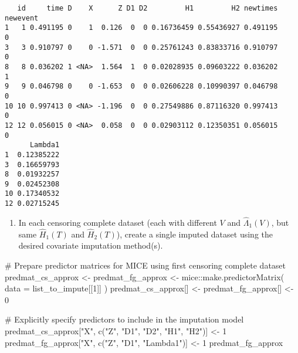 \documentclass[
  12pt,
  a4paper,
]{article}
\newenvironment{Shaded}{\begin{snugshade}}{\end{snugshade}}
\newcommand{\AttributeTok}[1]{\textcolor[rgb]{0.40,0.45,0.13}{#1}}
\newcommand{\CommentTok}[1]{\textcolor[rgb]{0.37,0.37,0.37}{#1}}
\newcommand{\DecValTok}[1]{\textcolor[rgb]{0.68,0.00,0.00}{#1}}
\newcommand{\FunctionTok}[1]{\textcolor[rgb]{0.28,0.35,0.67}{#1}}
\newcommand{\NormalTok}[1]{\textcolor[rgb]{0.00,0.23,0.31}{#1}}
\newcommand{\OtherTok}[1]{\textcolor[rgb]{0.00,0.23,0.31}{#1}}
\newcommand{\SpecialCharTok}[1]{\textcolor[rgb]{0.37,0.37,0.37}{#1}}
\newcommand{\StringTok}[1]{\textcolor[rgb]{0.13,0.47,0.30}{#1}}
\providecommand{\tightlist}{%
  \setlength{\itemsep}{0pt}\setlength{\parskip}{0pt}}\usepackage{longtable,booktabs,array}
\begin{document}
\begin{verbatim}
   id     time D    X      Z D1 D2         H1         H2 newtimes newevent
1   1 0.491195 0    1  0.126  0  0 0.16736459 0.55436927 0.491195        0
3   3 0.910797 0    0 -1.571  0  0 0.25761243 0.83833716 0.910797        0
8   8 0.036202 1 <NA>  1.564  1  0 0.02028935 0.09603222 0.036202        1
9   9 0.046798 0    0 -1.653  0  0 0.02606228 0.10990397 0.046798        0
10 10 0.997413 0 <NA> -1.196  0  0 0.27549886 0.87116320 0.997413        0
12 12 0.056015 0 <NA>  0.058  0  0 0.02903112 0.12350351 0.056015        0
      Lambda1
1  0.12385222
3  0.16659793
8  0.01932257
9  0.02452308
10 0.17340532
12 0.02715245
\end{verbatim}

\begin{enumerate}
\def\labelenumi{\arabic{enumi}.}
\setcounter{enumi}{3}
\tightlist
\item
  In each censoring complete dataset (each with different \(V\) and
  \(\hat{\Lambda}_1(V)\), but same \(\hat{H}_1(T)\) and
  \(\hat{H}_2(T)\)), create a single imputed dataset using the desired
  covariate imputation method(s).
\end{enumerate}

\begin{Shaded}
\begin{Highlighting}[]
\CommentTok{\# Prepare predictor matrices for MICE using first censoring complete dataset}
\NormalTok{predmat\_cs\_approx }\OtherTok{\textless{}{-}}\NormalTok{ predmat\_fg\_approx }\OtherTok{\textless{}{-}}\NormalTok{ mice}\SpecialCharTok{::}\FunctionTok{make.predictorMatrix}\NormalTok{(}
  \AttributeTok{data =}\NormalTok{ list\_to\_impute[[}\DecValTok{1}\NormalTok{]]}
\NormalTok{)}
\NormalTok{predmat\_cs\_approx[] }\OtherTok{\textless{}{-}}\NormalTok{ predmat\_fg\_approx[] }\OtherTok{\textless{}{-}} \DecValTok{0}

\CommentTok{\# Explicitly specify predictors to include in the imputation model}
\NormalTok{predmat\_cs\_approx[}\StringTok{"X"}\NormalTok{, }\FunctionTok{c}\NormalTok{(}\StringTok{"Z"}\NormalTok{, }\StringTok{"D1"}\NormalTok{, }\StringTok{"D2"}\NormalTok{, }\StringTok{"H1"}\NormalTok{, }\StringTok{"H2"}\NormalTok{)] }\OtherTok{\textless{}{-}} \DecValTok{1}
\NormalTok{predmat\_fg\_approx[}\StringTok{"X"}\NormalTok{, }\FunctionTok{c}\NormalTok{(}\StringTok{"Z"}\NormalTok{, }\StringTok{"D1"}\NormalTok{, }\StringTok{"Lambda1"}\NormalTok{)] }\OtherTok{\textless{}{-}} \DecValTok{1}
\NormalTok{predmat\_fg\_approx}
\end{Highlighting}
\end{Shaded}
\end{document}
